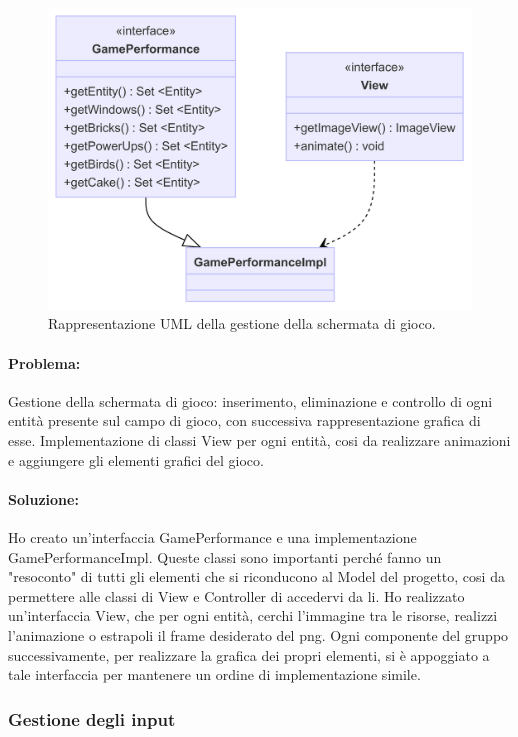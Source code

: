 \begin{figure}[H]
\centering{}
\includegraphics[width=\textwidth]{img/game.png}
\caption{Rappresentazione UML della gestione della schermata di gioco.}
\end{figure}

\paragraph{Problema:}
Gestione della schermata di gioco: inserimento, eliminazione e controllo di ogni entità presente sul campo di gioco, con successiva rappresentazione grafica di esse.
Implementazione di classi View per ogni entità, cosi da realizzare animazioni e aggiungere gli elementi grafici del gioco.

\paragraph{Soluzione:}
Ho creato un'interfaccia GamePerformance e una implementazione GamePerformanceImpl.
Queste classi sono importanti perché fanno un "resoconto" di tutti gli elementi che si riconducono al Model del progetto, cosi da permettere alle classi di View e Controller di accedervi da li.
Ho realizzato un'interfaccia View, che per ogni entità, cerchi l'immagine tra le risorse, realizzi l'animazione o estrapoli il frame desiderato del png.
Ogni componente del gruppo successivamente, per realizzare la grafica dei propri elementi, si è appoggiato a tale interfaccia per mantenere un ordine di implementazione simile.

\subsubsection{Gestione degli input }

